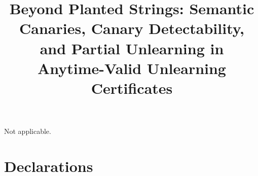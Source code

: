 \documentclass[pdflatex,sn-mathphys-num]{sn-jnl}
\theoremstyle{thmstyleone}
\theoremstyle{thmstyletwo}
\theoremstyle{thmstylethree}
\begin{document}
\title[Semantic Canaries and Partial Unlearning in Unlearning Certificates]{Beyond Planted
Strings: Semantic Canaries, Canary Detectability, and Partial Unlearning in Anytime-Valid
Unlearning Certificates}

\newif\ifanon
\anontrue

\ifanon
\author*[1]{}
\else
\author*[1]{\fnm{Quang-Vinh} \sur{Dang}}\email{vinh.dq4@buv.edu.vn}
\affil*[1]{\orgname{British University Vietnam}, \orgaddress{\city{Hung Yen},
\country{Vietnam}}}
\fi

\abstract{}


\maketitle











\backmatter

 Not applicable.

\section*{Declarations}
\end{document}
